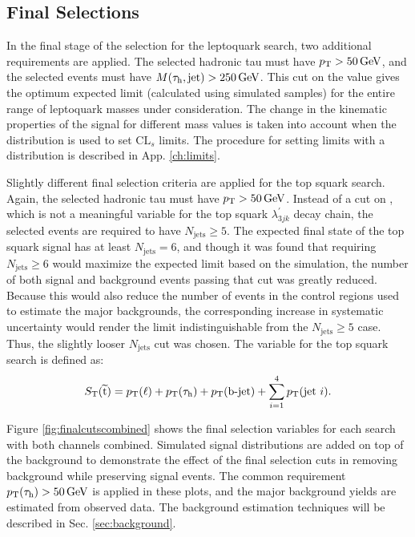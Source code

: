 
\subsection{Final Selections}

In the final stage of the selection for the leptoquark search, two additional requirements are applied. The selected hadronic tau must have $p_{\mathrm{T}}>50\,\text{Ge\hspace{-.08em}V}$, and the selected events must have $M(\tau_{\text{h}},\text{jet})>250\,\text{Ge\hspace{-.08em}V}$. This cut on the \MassTJ value gives the optimum expected limit (calculated using simulated samples) for the entire range of leptoquark masses under consideration. The change in the kinematic properties of the signal for different mass values is taken into account when the \ST distribution is used to set $\text{CL}_{s}$ limits. The procedure for setting limits with a distribution is described in App. \ref{ch:limits}.

Slightly different final selection criteria are applied for the top squark search. Again, the selected hadronic tau must have $p_{\mathrm{T}}>50\,\text{Ge\hspace{-.08em}V}$. Instead of a cut on \MassTJ, which is not a meaningful variable for the top squark $\lambda^{\prime}_{3jk}$ decay chain, the selected events are required to have $N_{\text{jets}}\geq5$. The expected final state of the top squark signal has at least $N_{\text{jets}}=6$, and though it was found that requiring $N_{\text{jets}}\geq6$ would maximize the expected limit based on the simulation, the number of both signal and background events passing that cut was greatly reduced. Because this would also reduce the number of events in the control regions used to estimate the major backgrounds, the corresponding increase in systematic uncertainty would render the limit indistinguishable from the $N_{\text{jets}}\geq5$ case. Thus, the slightly looser $N_{\text{jets}}$ cut was chosen. The \ST variable for the top squark search is defined as:
\begin{equation}
\label{eq:STstop}
S_{\text{T}}(\widetilde{\mathrm{t}}) = p_{\mathrm{T}}(\ell) + p_{\mathrm{T}}(\tau_{\text{h}}) + p_{\mathrm{T}}(\text{b-jet}) + \sum_{i=1}^{4}p_{\mathrm{T}}(\text{jet }i).
\end{equation}

Figure \ref{fig:finalcutscombined} shows the final selection variables for each search with both channels combined. Simulated signal distributions are added on top of the background to demonstrate the effect of the final selection cuts in removing background while preserving signal events. The common requirement $p_{\mathrm{T}}(\tau_{\text{h}})>50\,\text{Ge\hspace{-.08em}V}$ is applied in these plots, and the major background yields are estimated from observed data. The background estimation techniques will be described in Sec. \ref{sec:background}.

